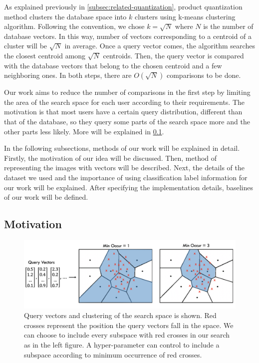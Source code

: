 As explained previously in \ref{subsec:related-quantization}, product quantization method clusters the database space into $k$ clusters using k-means clustering algorithm. 
Following the convention, we chose $k=\sqrt{N}$ where $N$ is the number of database vectors. 
In this way, number of vectors corresponding to a centroid of a cluster will be $\sqrt{N}$ in average. 
Once a query vector comes, the algorithm searches the closest centroid among $\sqrt{N}$ centroids. 
Then, the query vector is compared with the database vectors that belong to the chosen centroid and a few neighboring ones. 
In both steps, there are $O(\sqrt{N})$ comparisons to be done. 

Our work aims to reduce the number of comparisons in the first step by limiting the area of the search space for each user according to their requirements. 
The motivation is that most users have a certain query distribution, different than that of the database, 
so they query some parts of the search space more and the other parts less likely. More will be explained in \ref{motivation}.

In the following subsections, methods of our work will be explained in detail. 
Firstly, the motivation of our idea will be discussed.
Then, method of representing the images with vectors will be described. 
Next, the details of the dataset we used and the importance of using classification label information for our work will be explained. 
After specifying the implementation details, baselines of our work will be defined.

\subsection{Motivation}
\label{motivation}

\begin{figure}
    \centering
    \includegraphics[width=\textwidth]{thesis/images/improvement-fig.png}
    \caption{Query vectors and clustering of the search space is shown. Red crosses represent the position the query vectors fall in the space. We can choose to include every subspace with red crosses in our search as in the left figure. A hyper-parameter can control to include a subspace according to minimum occurrence of red crosses.}
    \label{fig:motivation}
\end{figure}

